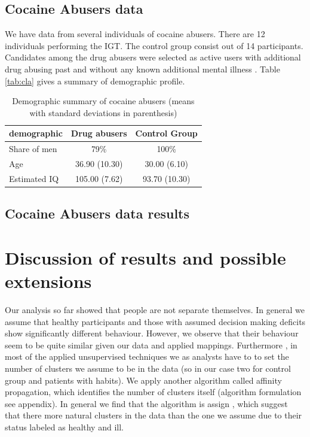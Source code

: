 \documentclass[12pt,a4paper,bibliography=totocnumbered,listof=totocnumbered]{scrartcl}
\begin{document}
\subsection{Cocaine Abusers data}

We have data from several individuals of cocaine abusers. There are 12 individuals performing the IGT. The control group consist out of 14 participants. Candidates among the drug abusers were selected as active users with additional drug abusing past and without any known additional mental illness \cite{stout2004}. Table \ref{tab:cla} gives a summary of demographic profile.

\setlength{\tabcolsep}{12pt}
\renewcommand{\arraystretch}{1}
\begin{table}[!htbp]
	\centering 
	\begin{tabular}{lcc}
		\toprule
		\textbf{demographic} & \textbf{Drug abusers} & \textbf{Control Group} \\
		\hline
		Share of men &  79\% & 100\%\\
		Age & 36.90 (10.30) & 30.00 (6.10) \\
		Estimated IQ & 105.00 (7.62) & 93.70 (10.30) \\
		\bottomrule
	\end{tabular}
	\caption{Demographic summary of cocaine abusers (means with standard deviations in parenthesis)}
	\label{tab:cocs}
\end{table}

\subsection{Cocaine Abusers data results}

\section{Discussion of results and possible extensions }

Our analysis so far showed that people are not separate themselves. In general we assume that healthy participants and those with assumed decision making deficits show significantly different behaviour. However, we observe that their behaviour seem to be quite similar given our data and applied mappings. Furthermore , in most of the applied unsupervised techniques we as analysts have to to set the number of clusters we assume to be in the data (so in our case two for control group and patients with habits). We apply another algorithm called affinity propagation, which identifies the number of clusters itself (algorithm formulation see appendix). In general we find that the algorithm is assign , which suggest that there more natural clusters in the data than the  one we assume due to their status labeled as healthy and ill.
\end{document}
